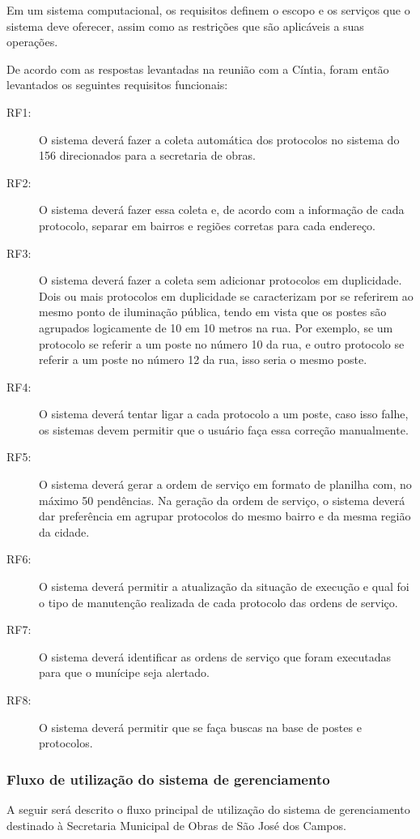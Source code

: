 \documentclass[
	article,			%
	11pt,				%
	oneside,			%
	a4paper,			%
	english,			%
	brazil,				%
	sumario=tradicional
	]{abntex2}
\begin{document}
Em um sistema computacional, os requisitos definem o escopo e os serviços que o
sistema deve oferecer, assim como as restrições que são aplicáveis a suas
operações.

De acordo com as respostas levantadas na reunião com a Cíntia, foram então levantados os seguintes requisitos funcionais:

\begin{description}
\item[RF1:] O sistema deverá fazer a coleta automática dos protocolos no sistema do 156
direcionados para a secretaria de obras.
\item[RF2:] O sistema deverá fazer essa coleta e, de acordo com a informação de cada
protocolo, separar em bairros e regiões corretas para cada endereço.
\item[RF3:] O sistema deverá fazer a coleta sem adicionar protocolos em duplicidade.
Dois ou mais protocolos em duplicidade se caracterizam por se referirem ao
mesmo ponto de iluminação pública, tendo em vista que os postes são agrupados
logicamente de 10 em 10 metros na rua. Por exemplo, se um protocolo se referir
a um poste no número 10 da rua, e outro protocolo se referir a um poste no número
12 da rua, isso seria o mesmo poste.
\item[RF4:] O sistema deverá tentar ligar a cada protocolo a um poste, caso isso falhe,
os sistemas devem permitir que o usuário faça essa correção manualmente.
\item[RF5:] O sistema deverá gerar a ordem de serviço em formato de planilha com,
no máximo 50 pendências. Na geração da ordem de serviço, o sistema deverá
dar preferência em agrupar protocolos do mesmo bairro e da mesma região da cidade.
\item[RF6:] O sistema deverá permitir a atualização da situação de execução e qual foi
o tipo de manutenção realizada de cada protocolo das ordens de serviço.
\item[RF7:] O sistema deverá identificar as ordens de serviço que foram executadas para
que o munícipe seja alertado.
\item[RF8:] O sistema deverá permitir que se faça buscas na base de postes e protocolos.
\end{description}

\subsubsection{Fluxo de utilização do sistema de gerenciamento}

A seguir será descrito o fluxo principal de utilização do sistema de gerenciamento destinado à
Secretaria Municipal de Obras de São José dos Campos.
\end{document}
